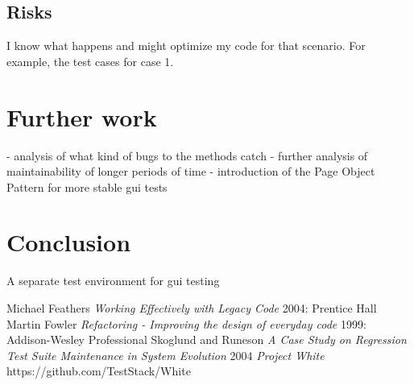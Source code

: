 \documentclass{article}
\begin{document}
		\subsection{Risks}
		I know what happens and might optimize my code for that scenario. For example, the test cases for case 1. 

	\section{Further work}
	- analysis of what kind of bugs to the methods catch
	- further analysis of maintainability of longer periods of time 
	- introduction of the Page Object Pattern for more stable gui tests

	\section{Conclusion}
		A separate test environment for gui testing

\begin{thebibliography}{1}
 Michael Feathers {\em Working Effectively with Legacy Code} 2004: Prentice Hall
 Martin Fowler {\em Refactoring - Improving the design of everyday code} 1999: Addison-Wesley Professional
 Skoglund and Runeson {\em A Case Study on Regression Test Suite Maintenance in System Evolution} 2004 
 {\em Project White} https://github.com/TestStack/White
\end{thebibliography}
\end{document}
